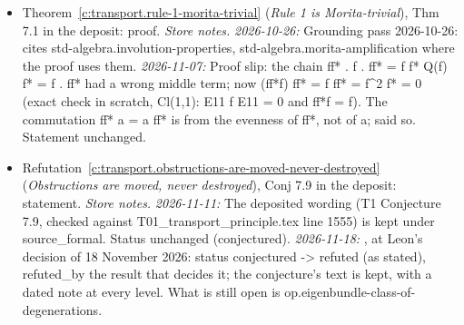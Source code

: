 \documentclass[11pt]{article}
\theoremstyle{definition}
\theoremstyle{plain}
\begin{document}
\begin{itemize}
\item Theorem~\ref{c:transport.rule-1-morita-trivial} (\emph{Rule 1 is Morita-trivial}), Thm 7.1 in the deposit: proof. \emph{Store notes.} \emph{2026-10-26:} Grounding pass 2026-10-26: cites std-algebra.involution-properties, std-algebra.morita-amplification where the proof uses them. \emph{2026-11-07:} Proof slip: the chain ff* . f . ff* = f f* Q(f) f* = f . ff* had a wrong middle term; now (ff*f) ff* = f ff* = f\^{}2 f* = 0 (exact check in scratch, Cl(1,1): E11 f E11 = 0 and ff*f = f). The commutation ff* a = a ff* is from the evenness of ff*, not of a; said so. Statement unchanged.
\item Refutation~\ref{c:transport.obstructions-are-moved-never-destroyed} (\emph{Obstructions are moved, never destroyed}), Conj 7.9 in the deposit: statement. \emph{Store notes.} \emph{2026-11-11:} The deposited wording (T1 Conjecture 7.9, checked against T01\_transport\_principle.tex line 1555) is kept under source\_formal. Status unchanged (conjectured). \emph{2026-11-18:} , at Leon's decision of 18 November 2026: status conjectured -> refuted (as stated), refuted\_by the result that decides it; the conjecture's text is kept, with a dated note at every level. What is still open is op.eigenbundle-class-of-degenerations.
\end{itemize}
\end{document}
